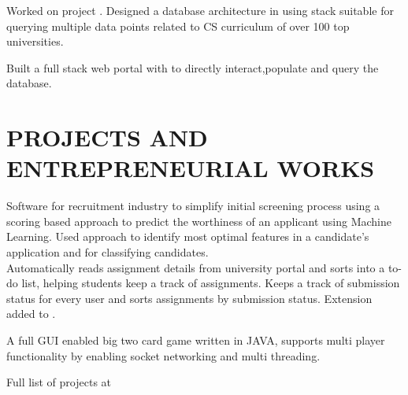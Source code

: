\documentclass[]{deedy-resume-openfont}
\begin{document}
\begin{minipage}[t]{0.64\textwidth}
\begin{tightemize}\item Worked on project . Designed a database architecture in  using  stack suitable for querying multiple data points related to CS curriculum of over 100 top universities.
\end{tightemize}
\begin{tightemize}\item Built a full stack web portal with  to directly interact,populate and query the database.
\end{tightemize}
\sectionsep



\section{PROJECTS AND ENTREPRENEURIAL WORKS}
Software for recruitment industry to simplify initial screening process
using a scoring based approach to predict the worthiness of an applicant
using Machine Learning. Used 
approach to identify most optimal features in a candidate’s application
and  for classifying candidates. 
\sectionsep
\\
Automatically reads assignment details from university portal and sorts
into a to-do list, helping students keep a track of assignments. Keeps a
track of submission status for every user and sorts assignments by
submission status. Extension added to .
\sectionsep

A full GUI enabled big two card game written in JAVA, supports multi player functionality by enabling socket networking and multi threading.\\
\sectionsep
\vspace{0.1 mm}

Full list of projects at \href{https://github.com/abhimanyu891998}{}
\vspace{1 mm}


\end{minipage}
\end{document}

